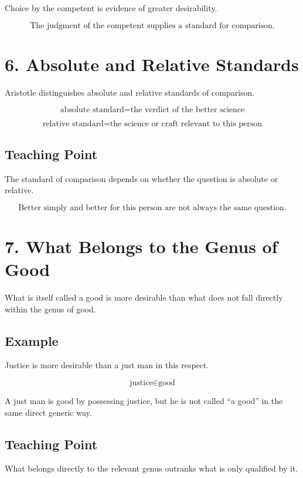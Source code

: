 \documentclass[12pt]{article}
\begin{document}
Choice by the competent is evidence of greater desirability.

\[
\boxed{
\text{The judgment of the competent supplies a standard for comparison.}
}
\]

\section*{6. Absolute and Relative Standards}

Aristotle distinguishes absolute and relative standards of comparison.

\[
\text{absolute standard} = \text{the verdict of the better science}
\]

\[
\text{relative standard} = \text{the science or craft relevant to this person}
\]

\subsection*{Teaching Point}

The standard of comparison depends on whether the question is absolute or
relative.

\[
\boxed{
\text{Better simply and better for this person are not always the same question.}
}
\]

\section*{7. What Belongs to the Genus of Good}

What is itself called a good is more desirable than what does not fall directly
within the genus of good.

\subsection*{Example}

Justice is more desirable than a just man in this respect.

\[
\text{justice} \in \text{good}
\]

A just man is good by possessing justice, but he is not called ``a good'' in the
same direct generic way.

\subsection*{Teaching Point}

What belongs directly to the relevant genus outranks what is only qualified by
it.
\end{document}
